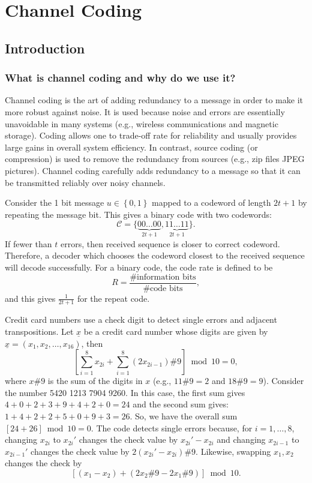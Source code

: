\chapter{Channel Coding}
\label{chapter:ChannelCoding}

\section{Introduction}

\subsection{What is channel coding and why do we use it?}

Channel coding is the art of adding redundancy to a message in order to make it more robust against noise.
It is used because noise and errors are essentially unavoidable in many systems (e.g., wireless communications and magnetic storage).
Coding allows one to trade-off rate for reliability and usually provides large gains in overall system efficiency.
In contrast, source coding (or compression) is used to remove the redundancy from sources (e.g., zip files JPEG pictures).
Channel coding carefully adds redundancy to a message so that it can be transmitted reliably over noisy channels. 

\begin{example}
Consider the 1 bit message $u\in\left\{ 0,1\right\} $ mapped to a codeword of length $2t+1$ by repeating the message bit.
This gives a binary code with two codewords:
\[ \mathcal{C}=\{\underbrace{00\ldots00}_{2t+1},\underbrace{11\ldots11}_{2t+1}\}. \]
If fewer than $t$ errors, then received sequence is closer to correct codeword.
Therefore, a decoder which chooses the codeword closest to the received sequence will decode successfully.
For a binary code, the code rate is defined to be
\[R=\frac{\mbox{\# information bits}}{\mbox{\# code bits}},\]
and this gives $\frac{1}{2t+1}$ for the repeat code.
\end{example}


\begin{example}
Credit card numbers use a check digit to detect single errors and adjacent transpositions.
Let $\underline{x}$ be a credit card number whose digits are given by $\underline{x}=\left(x_{1},x_{2},\ldots,x_{16}\right)$,
then
\[ \left[\sum_{i=1}^{8}x_{2i}+\sum_{i=1}^{8}\left(2x_{2i-1}\right)\# 9 \right]\bmod10=0,\]
where $x\# 9$ is the sum of the digits in $x$ (e.g., $11\# 9=2$ and $18\# 9=9$).
Consider the number 5420 1213 7904 9260.
In this case, the first sum gives $4+0+2+3+9+4+2+0=24$ and the second sum gives: $1+4+2+2+5+0+9+3=26$.
So, we have the overall sum $\left[24+26\right]\bmod10=0$.
The code detects single errors because, for $i=1,\ldots,8$, changing $x_{2i}$ to $x_{2i}'$ changes the check value by $x_{2i}'-x_{2i}$ and changing $x_{2i-1}$ to $x_{2i-1}'$ changes the check value by $2(x_{2i}'-x_{2i})\# 9$.
Likewise,  swapping $x_{1},x_{2}$ changes the check by
\[ \left[(x_{1}-x_{2})+(2x_{2}\# 9-2x_{1}\# 9)\right]\bmod10. \]
\end{example}

